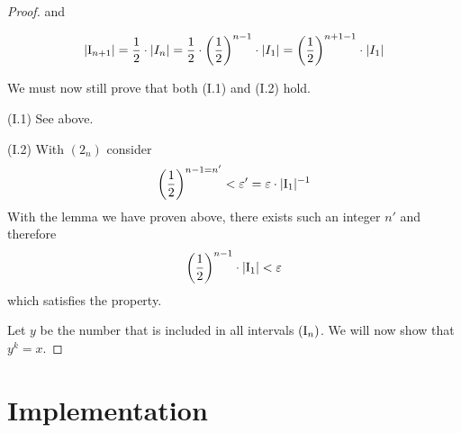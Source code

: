 \documentclass[a4paper, 10pt]{article}
\theoremstyle{definition}
\theoremstyle{definition}
\begin{document}
\begin{proof}
    and
    
    \[
        |\text{I}_{n+1}| = \frac{1}{2} \cdot |I_n| = \frac{1}{2} \cdot \left(\frac{1}{2}\right)^{n-1} \cdot |I_1| = \left(\frac{1}{2}\right)^{n+1-1} \cdot |I_1|
    \]

    We must now still prove that both (I.1) and (I.2) hold.

    \item{\hspace{0.5cm}(I.1)} See above. %
    
    \item{\hspace{0.5cm}(I.2)} With \((2_n)\) consider
    \[
        \left(\frac{1}{2}\right)^{n-1=n'} < \varepsilon' = \varepsilon \cdot |\text{I}_1|^{-1}
    \]
    With the lemma we have proven above, there exists such an integer \(n'\) and therefore
    \[
        \left(\frac{1}{2}\right)^{n-1} \cdot |\text{I}_1| < \varepsilon 
    \]
    which satisfies the property.

    Let \(y\) be the number that is included  in all intervals \((\text{I}_n)\). We will now show that \(y^k = x\).

    \end{proof}

    \section{Implementation}

    \printbibliography
\end{document}
